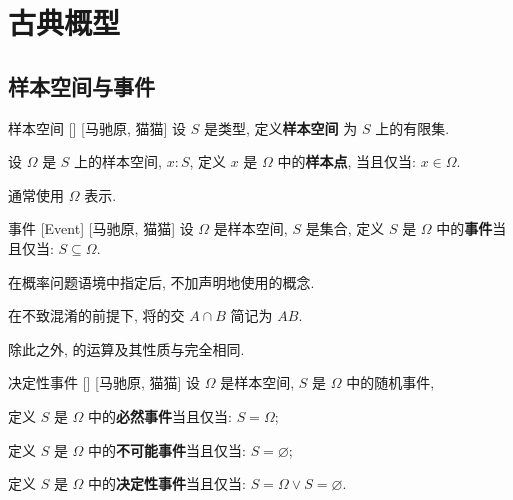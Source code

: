 \documentclass[UTF8]{ctexart}
\begin{document}
\tableofcontents
\newpage

\section{古典概型}

    \subsection{样本空间与事件}

        \begin{dfn}
            {样本空间}
            []
            [马驰原, 猫猫]
            设 \(S\) 是类型, 定义\textbf{样本空间} 为 \(S\) 上的有限集. 

            设 \(\Omega\) 是 \(S\) 上的样本空间, \(x:S\), 定义 \(x\) 是 \(\Omega\) 中的\textbf{样本点}, 当且仅当: \(x\in\Omega\). 
        \end{dfn}

        \begin{rmk}
            [猫猫]
            通常使用 \(\Omega\) 表示. 
        \end{rmk}

        \begin{dfn}
            [Event]
            {事件}
            [Event]
            [马驰原, 猫猫]
            设 \(\Omega\) 是样本空间, \(S\) 是集合, 定义 \(S\) 是 \(\Omega\) 中的\textbf{事件}当且仅当: \(S\subseteq\Omega\). 
        \end{dfn}

        \begin{rmk}
            [猫猫]
            在概率问题语境中指定 后, 不加声明地使用 的概念. 
        \end{rmk}

        \begin{rmk}
            [猫猫]
            在不致混淆的前提下, 将 的交 \(A\cap B\) 简记为 \(AB\). 

            除此之外,  的运算及其性质与 完全相同. 
        \end{rmk}

        \begin{dfn}
            []
            {决定性事件}
            []
            [马驰原, 猫猫]
            设 \(\Omega\) 是样本空间, \(S\) 是 \(\Omega\) 中的随机事件, 

            定义 \(S\) 是 \(\Omega\) 中的\textbf{必然事件}当且仅当: \(S=\Omega\); 

            定义 \(S\) 是 \(\Omega\) 中的\textbf{不可能事件}当且仅当: \(S=\varnothing\); 

            定义 \(S\) 是 \(\Omega\) 中的\textbf{决定性事件}当且仅当: \(S=\Omega\lor S=\varnothing\). 
        \end{dfn}
\end{document}

